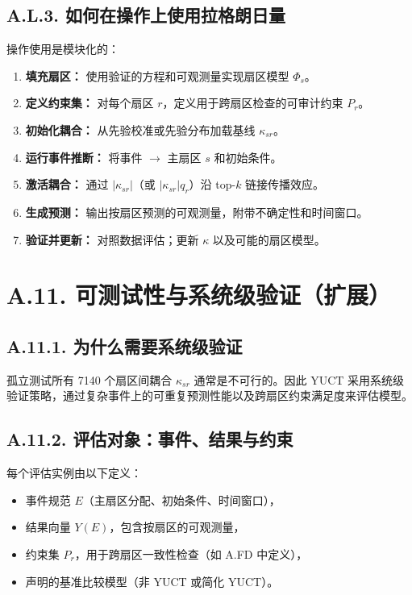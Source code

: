 \documentclass[11pt,a4paper]{article}
\begin{document}
	\subsection*{A.L.3. 如何在操作上使用拉格朗日量}
	操作使用是模块化的：
	\begin{enumerate}[leftmargin=*]
		\item \textbf{填充扇区：} 使用验证的方程和可观测量实现扇区模型 $\Phi_s$。
		\item \textbf{定义约束集：} 对每个扇区 $r$，定义用于跨扇区检查的可审计约束 $P_r$。
		\item \textbf{初始化耦合：} 从先验校准或先验分布加载基线 $\kappa_{sr}$。
		\item \textbf{运行事件推断：} 将事件 $\to$ 主扇区 $s$ 和初始条件。
		\item \textbf{激活耦合：} 通过 $|\kappa_{sr}|$（或 $|\kappa_{sr}|q_r$）沿 top-$k$ 链接传播效应。
		\item \textbf{生成预测：} 输出按扇区预测的可观测量，附带不确定性和时间窗口。
		\item \textbf{验证并更新：} 对照数据评估；更新 $\kappa$ 以及可能的扇区模型。
	\end{enumerate}
	
	\section*{A.11. 可测试性与系统级验证（扩展）}
	\label{sec:extended-testability}
	
	\subsection*{A.11.1. 为什么需要系统级验证}
	孤立测试所有 7140 个扇区间耦合 $\kappa_{sr}$ 通常是不可行的。因此 YUCT 采用系统级验证策略，通过复杂事件上的可重复预测性能以及跨扇区约束满足度来评估模型。
	
	\subsection*{A.11.2. 评估对象：事件、结果与约束}
	每个评估实例由以下定义：
	\begin{itemize}[leftmargin=*]
		\item 事件规范 $E$（主扇区分配、初始条件、时间窗口），
		\item 结果向量 $Y(E)$，包含按扇区的可观测量，
		\item 约束集 $P_r$，用于跨扇区一致性检查（如 A.FD 中定义），
		\item 声明的基准比较模型（非 YUCT 或简化 YUCT）。
	\end{itemize}
	
\end{document}
